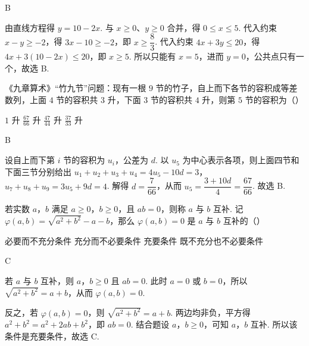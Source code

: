 \begin{answer}
B
\end{answer}

\begin{solution}
由直线方程得 \(y=10-2x\). 与 \(x\geqslant0\)、\(y\geqslant0\) 合并，得 \(0\leqslant x\leqslant5\). 代入约束 \(x-y\geqslant-2\)，得 \(3x-10\geqslant-2\)，即 \(x\geqslant\dfrac83\). 代入约束 \(4x+3y\leqslant20\)，得 \(4x+3(10-2x)\leqslant20\)，即 \(x\geqslant5\). 所以只能有 \(x=5\)，进而 \(y=0\)，公共点只有一个，故选 B.
\end{solution}

\begin{problem}
《九章算术》“竹九节”问题：现有一根 \(9\) 节的竹子，自上而下各节的容积成等差数列，上面 \(4\) 节的容积共 \(3\text{ 升}\)，下面 \(3\) 节的容积共 \(4\text{ 升}\)，则第 \(5\) 节的容积为（\quad）

\choices
    {\(1\text{ 升}\)}
    {\(\frac{67}{66}\text{ 升}\)}
    {\(\frac{47}{44}\text{ 升}\)}
    {\(\frac{37}{33}\text{ 升}\)}
\end{problem}

\begin{answer}
B
\end{answer}

\begin{solution}
设自上而下第 \(i\) 节的容积为 \(u_i\)，公差为 \(d\). 以 \(u_5\) 为中心表示各项，则上面四节和下面三节分别给出
\(u_1+u_2+u_3+u_4=4u_5-10d=3\)，
\(u_7+u_8+u_9=3u_5+9d=4\). 解得 \(d=\dfrac7{66}\)，从而 \(u_5=\dfrac{3+10d}{4}=\dfrac{67}{66}\). 故选 B.
\end{solution}

\begin{problem}
若实数 \(a\)，\(b\) 满足 \(a \geqslant 0\)，\(b \geqslant 0\)，且 \(ab = 0\)，则称 \(a\) 与 \(b\) 互补. 记 \(\varphi(a, b) = \sqrt{a^2 + b^2} - a - b\)，那么 \(\varphi(a, b) = 0\) 是 \(a\) 与 \(b\) 互补的（\quad）

\choices
    {必要而不充分条件}
    {充分而不必要条件}
    {充要条件}
    {既不充分也不必要条件}
\end{problem}

\begin{answer}
C
\end{answer}

\begin{solution}
若 \(a\) 与 \(b\) 互补，则 \(a\)，\(b\geqslant0\) 且 \(ab=0\). 此时 \(a=0\) 或 \(b=0\)，所以
\(\sqrt{a^2+b^2}=a+b\)，从而 \(\varphi(a,b)=0\).

反之，若 \(\varphi(a,b)=0\)，则 \(\sqrt{a^2+b^2}=a+b\). 两边均非负，平方得
\(a^2+b^2=a^2+2ab+b^2\)，即 \(ab=0\). 结合题设 \(a\)，\(b\geqslant0\)，可知 \(a\)，\(b\) 互补. 所以该条件是充要条件，故选 C.
\end{solution}

